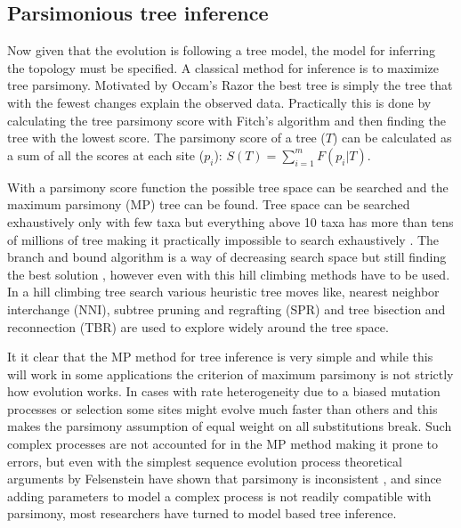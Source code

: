 \subsection{Parsimonious tree inference}
Now given that the evolution is following a tree model, the model for inferring the topology must be specified.
A classical method for inference is to maximize tree parsimony.
Motivated by Occam's Razor the best tree is simply the tree that with the fewest changes explain the observed data.
Practically this is done by calculating the tree parsimony score with Fitch's algorithm \cite{fitch1971toward} and then finding the tree with the lowest score.
The parsimony score of a tree ($T$) can be calculated as a sum of all the scores at each site ($p_i$): $S(T) = \sum_{i=1}^m F(p_i | T)$.

With a parsimony score function the possible tree space can be searched and the maximum parsimony (MP) tree can be found.
Tree space can be searched exhaustively only with few taxa but everything above 10 taxa has more than tens of millions of tree making it practically impossible to search exhaustively \cite{felsenstein1978number}.
The branch and bound algorithm is a way of decreasing search space but still finding the best solution \cite{hendy1982branch}, however even with this hill climbing methods have to be used.
In a hill climbing tree search various heuristic tree moves like, nearest neighbor interchange (NNI), subtree pruning and regrafting (SPR) and tree bisection and reconnection (TBR) are used to explore widely around the tree space.

It it clear that the MP method for tree inference is very simple and while this will work in some applications the criterion of maximum parsimony is not strictly how evolution works.
In cases with rate heterogeneity due to a biased mutation processes or selection some sites might evolve much faster than others and this makes the parsimony assumption of equal weight on all substitutions break.
Such complex processes are not accounted for in the MP method making it prone to errors, but even with the simplest sequence evolution process theoretical arguments by Felsenstein have shown that parsimony is inconsistent \cite{felsenstein1978cases}, and since adding parameters to model a complex process is not readily compatible with parsimony, most researchers have turned to model based tree inference.




